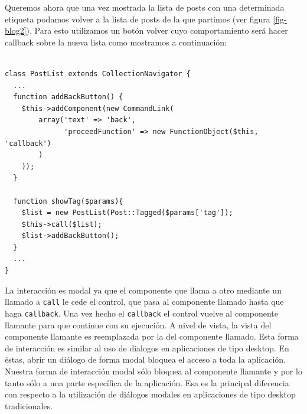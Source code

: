 Queremos ahora que una vez mostrada la lista de posts con una determinada etiqueta podamos volver a la lista de posts de la que partimos (ver figura \ref{fig-blog2}). Para esto utilizamos un botón volver cuyo comportamiento será hacer callback sobre la nueva lista como mostramos a continuación:

\begin{verbatim}

class PostList extends CollectionNavigator {
  ...
  function addBackButton() {
    $this->addComponent(new CommandLink(
        array('text' => 'back',
              'proceedFunction' => new FunctionObject($this, 'callback')
        )
    ));
  }

  function showTag($params){
    $list = new PostList(Post::Tagged($params['tag']);
    $this->call($list);
    $list->addBackButton();
  }
  ...
}

\end{verbatim}

La interacción es modal ya que el componente que llama a otro mediante un llamado a \verb"call" le cede el control, que pasa al componente llamado hasta que haga \verb'callback'. Una vez hecho el \verb'callback' el control vuelve al componente llamante para que continue con su ejecución. A nivel de vista, la vista del componente llamante es reemplazada por la del componente llamado. Esta forma de interacción es similar al uso de dialogos en aplicaciones de tipo desktop. En éstas, abrir un diálogo de forma modal bloquea el acceso a toda la aplicación. Nuestra forma de interacción modal sólo bloquea al componente llamante y por lo tanto sólo a una parte específica de la aplicación. Esa es la principal diferencia con respecto a la utilización de diálogos modales en aplicaciones de tipo desktop tradicionales.

